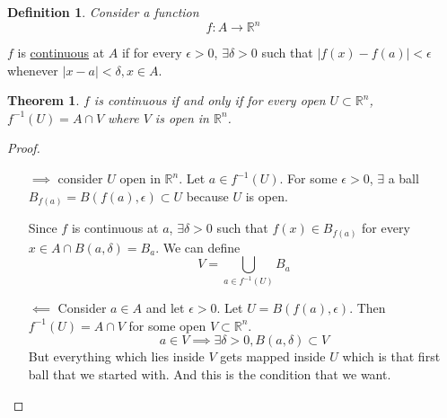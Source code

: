 \documentclass{article}
\newtheorem{theorem}{Theorem}
\newtheorem{definition}{Definition}
\newcommand{\reals}[0]{\mathbb{R}}
\begin{document}
\begin{definition}
  Consider a function \begin{equation}f: A \to \reals^n\end{equation}
\end{definition}
\(f\) is \underline{continuous} at \(A\) if for every \(\epsilon > 0\), \(\exists \delta > 0\) such that \(|f(x) - f(a)| < \epsilon\) whenever \(|x - a| < \delta, x \in A\).
\begin{theorem}
  \(f\) is continuous if and only if for every open \(U \subset \reals^n\), \(f^{-1}(U) = A \cap V\) where \(V\) is open in \(\reals^n\).
\end{theorem}
\begin{proof}

  \begin{itemize}

    \item [\(\implies\)] consider \(U\) open in \(\reals^n\). Let \(a \in f^{-1}(U)\). For some \(\epsilon > 0\), \(\exists\) a ball \(B_{f(a)} = B(f(a), \epsilon) \subset U\) because \(U\) is open.

    Since \(f\) is continuous at \(a\), \(\exists \delta > 0\) such that \(f(x) \in B_{f(a)}\) for every \(x \in A \cap B(a, \delta) = B_a\). We can define
    \begin{equation}V = \bigcup_{a \in f^{-1}(U)}B_a\end{equation}

    \item [\(\impliedby\)] Consider \(a \in A\) and let \(\epsilon > 0\). Let \(U = B(f(a), \epsilon)\). Then \(f^{-1}(U) = A \cap V\) for some open \(V \subset \reals^n\).
    \begin{equation}a \in V \implies \exists \delta > 0, B(a, \delta) \subset V\end{equation}
    But everything which lies inside \(V\) gets mapped inside \(U\) which is that first ball that we started with. And this is the condition that we want.

  \end{itemize}
\end{proof}
\end{document}
